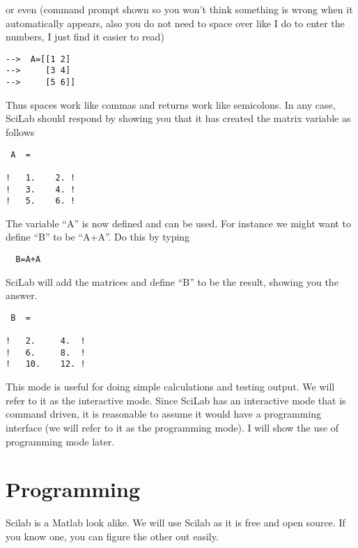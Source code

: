 or even (command prompt shown so you won't think something is wrong when it automatically appears, also you do not need to space over like I do to enter the numbers, I just find it easier to read)
\begin{verbatim}
-->  A=[[1 2]
-->     [3 4]
-->     [5 6]]
\end{verbatim}
Thus spaces work like commas and returns work like semicolons.  In any case, SciLab should respond by showing you that it has created the matrix variable as follows
\begin{verbatim}
 A  =

!   1.    2. !
!   3.    4. !
!   5.    6. !
\end{verbatim}
The variable ``A'' is now defined and can be used.  For instance we might want to define ``B'' to be ``A+A''.  Do this by typing
\begin{verbatim}
  B=A+A
\end{verbatim}
SciLab will add the matrices and define ``B'' to be the result, showing you the answer.
\begin{verbatim}
 B  =

!   2.     4.  !
!   6.     8.  !
!   10.    12. !
\end{verbatim}
This mode is useful for doing simple calculations and testing output.  We will refer to it as the interactive mode.  Since SciLab has an interactive mode that is command driven, it is reasonable to assume it would have a programming interface (we will refer to it as the programming mode).  I will show the use of programming mode later.

\section{Programming}

Scilab is a Matlab look alike.  We will use Scilab as it is free and open source.  If you know one, you can figure the other out easily.

